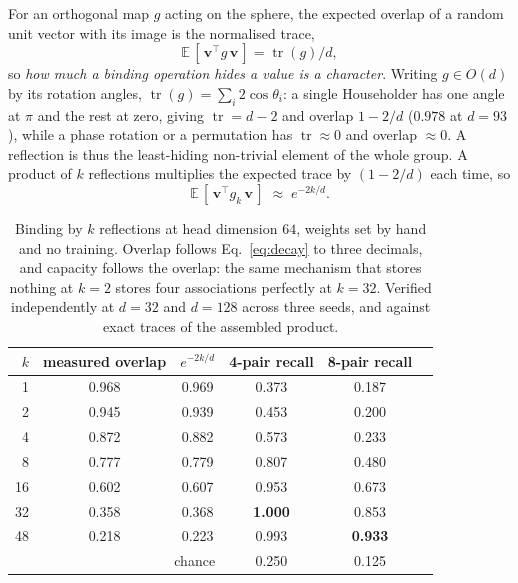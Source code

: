 \documentclass[10pt]{article}
\begin{document}
For an orthogonal map $g$ acting on the sphere, the expected overlap of a random unit vector with its
image is the normalised trace,
\begin{equation}
  \mathbb{E}\,[\,\mathbf{v}^\top g\,\mathbf{v}\,] = \operatorname{tr}(g)/d ,
  \label{eq:trace}
\end{equation}
so \emph{how much a binding operation hides a value is a character}. Writing $g\in O(d)$ by its
rotation angles, $\operatorname{tr}(g)=\sum_i 2\cos\theta_i$: a single Householder has one angle at
$\pi$ and the rest at zero, giving $\operatorname{tr}=d-2$ and overlap $1-2/d$ ($0.978$ at $d=93$),
while a phase rotation or a permutation has $\operatorname{tr}\approx0$ and overlap $\approx 0$. A
reflection is thus the least-hiding non-trivial element of the whole group. A product of $k$
reflections multiplies the expected trace by $(1-2/d)$ each time, so
\begin{equation}
  \mathbb{E}\,[\,\mathbf{v}^\top g_k\,\mathbf{v}\,] \;\approx\; e^{-2k/d} .
  \label{eq:decay}
\end{equation}

\begin{table}[t]
\centering\small
\begin{tabular}{@{}rccccc@{}}
\toprule
$k$ & measured overlap & $e^{-2k/d}$ & 4-pair recall & 8-pair recall \\
\midrule
1  & 0.968 & 0.969 & 0.373 & 0.187 \\
2  & 0.945 & 0.939 & 0.453 & 0.200 \\
4  & 0.872 & 0.882 & 0.573 & 0.233 \\
8  & 0.777 & 0.779 & 0.807 & 0.480 \\
16 & 0.602 & 0.607 & 0.953 & 0.673 \\
32 & 0.358 & 0.368 & \textbf{1.000} & 0.853 \\
48 & 0.218 & 0.223 & 0.993 & \textbf{0.933} \\
\midrule
\multicolumn{3}{r}{chance} & 0.250 & 0.125 \\
\bottomrule
\end{tabular}
\caption{Binding by $k$ reflections at head dimension $64$, weights set by hand and no training.
Overlap follows Eq.~\ref{eq:decay} to three decimals, and capacity follows the overlap: the same
mechanism that stores nothing at $k=2$ stores four associations perfectly at $k=32$. Verified
independently at $d=32$ and $d=128$ across three seeds, and against exact traces of the assembled
product.}
\label{tab:trace}
\end{table}
\end{document}
